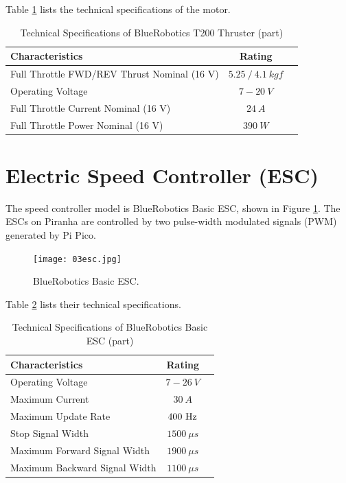 Table \ref{table:03motor} lists the technical specifications of the motor.

\begin{table}[ht]
\caption{Technical Specifications of BlueRobotics T200 Thruster (part)} %
\centering %
\renewcommand{\arraystretch}{0.8}
\begin{tabular}{l c l} %
\hline
\textbf{Characteristics} & \textbf{Rating} \\
\hline %
Full Throttle FWD/REV Thrust \@ Nominal (16 V) & $5.25\ /\ 4.1\ kgf$ \\
Operating Voltage & $7-20\ V$ \\
Full Throttle Current \@ Nominal (16 V) & $24\ A$ \\
Full Throttle Power \@ Nominal (16 V) & $390\ W$ \\
\hline
\end{tabular}
\label{table:03motor} %
\end{table}

\section{Electric Speed Controller (ESC)}

The speed controller model is BlueRobotics Basic ESC, shown in Figure \ref{fig:03esc}. The ESCs on Piranha are controlled by two pulse-width modulated signals (PWM) generated by Pi Pico.

\begin{figure}
    \centering
    \texttt{[image: 03esc.jpg]}
    \caption{BlueRobotics Basic ESC.}
    \label{fig:03esc}
\end{figure}

Table \ref{table:03esc} lists their technical specifications.

\begin{table}[ht]
\caption{Technical Specifications of BlueRobotics Basic ESC (part)} %
\centering %
\renewcommand{\arraystretch}{0.8}
\begin{tabular}{l c l} %
\hline
\textbf{Characteristics} & \textbf{Rating} \\ 
\hline %
Operating Voltage & $7-26\ V$ \\
Maximum Current & $30\ A$ \\
Maximum Update Rate & $400\ {\rm Hz}$ \\
Stop Signal Width & $1500\ \mu s$ \\
Maximum Forward Signal Width & $1900\ \mu s$ \\
Maximum Backward Signal Width & $1100\ \mu s$ \\
\hline
\end{tabular}
\label{table:03esc} %
\end{table}


